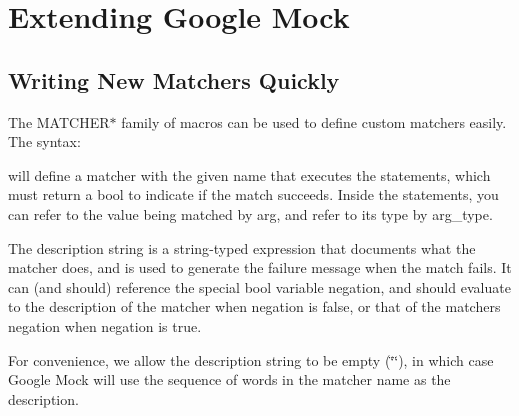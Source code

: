 \section*{Extending Google Mock}

\subsection*{Writing New Matchers Quickly}

The {\ttfamily M\+A\+T\+C\+H\+E\+R$\ast$} family of macros can be used to define custom matchers easily. The syntax\+:


\begin{DoxyCode}{0}
\end{DoxyCode}


will define a matcher with the given name that executes the statements, which must return a {\ttfamily bool} to indicate if the match succeeds. Inside the statements, you can refer to the value being matched by {\ttfamily arg}, and refer to its type by {\ttfamily arg\+\_\+type}.

The description string is a {\ttfamily string}-\/typed expression that documents what the matcher does, and is used to generate the failure message when the match fails. It can (and should) reference the special {\ttfamily bool} variable {\ttfamily negation}, and should evaluate to the description of the matcher when {\ttfamily negation} is {\ttfamily false}, or that of the matcher\textquotesingle{}s negation when {\ttfamily negation} is {\ttfamily true}.

For convenience, we allow the description string to be empty ({\ttfamily \char`\"{}\char`\"{}}), in which case Google Mock will use the sequence of words in the matcher name as the description.

